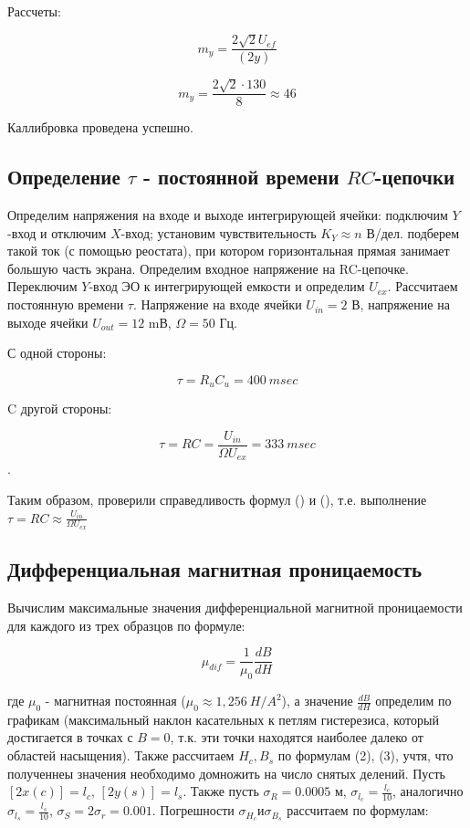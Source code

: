 \documentclass[a4paper, 14pt]{extarticle}
\begin{document}
Рассчеты:

$$m_y=\frac{2\sqrt{2}U_{ef}}{(2y)}$$

$$m_y=\frac{2\sqrt{2} \cdot 130}{8} \approx 46$$

Каллибровка проведена успешно.

\subsection {Определение $\tau$ - постоянной времени $RC$-цепочки}


Определим напряжения на входе и выходе интегрирующей ячейки: подключим $Y$-вход и отключим $X$-вход; установим чувствительность $K_Y \approx n$ В/дел. подберем такой ток (с помощью реостата), при котором горизонтальная прямая занимает большую часть экрана. Определим входное напряжение на RC-цепочке. Переключим $Y$-вход ЭО к интегрирующей емкости и определим $U_{ex}$. Рассчитаем постоянную времени $\tau$.
\newline
Напряжение на входе ячейки $U_{in} = 2$ В, напряжение на выходе ячейки $U_{out} = 12$ mВ, $\Omega=50$ Гц.

С одной стороны:

$$\tau=R_uC_u=400 \: msec
$$


C другой стороны:


$$\tau=RC=\frac{U_{in}}{\Omega U_{ex}}=333 \: msec $$ .

Таким образом, проверили справедливость формул () и (), т.е. выполнение $\tau=RC \approx \frac{U_{in}}{\Omega U_{ex}}$




\subsection{Дифференциальная магнитная проницаемость}



Вычислим максимальные значения дифференциальной магнитной проницаемости  для каждого из трех образцов по формуле:

\begin{equation}\label{}
    \mu_{dif}=\frac{1}{\mu_0}\frac{dB}{dH}
\end{equation}


где $\mu_0$ - магнитная постоянная ($\mu_0\approx1,256~ H/A^2$), а значение $\frac{dB}{dH}$ определим по графикам (максимальный наклон касательных к петлям гистерезиса, который достигается в точках с $B=0$, т.к. эти точки находятся наиболее далеко от областей насыщения).
\newline
Также рассчитаем $H_c, B_s$ по формулам (2), (3), учтя, что полученнеы значения необходимо домножить на число снятых делений.
\newline
Пусть $[2x(c)] = l_c$, $[2y(s)] = l_s$.
\newline
Также пусть $\sigma_R = 0.0005$ м, $\sigma_{l_c} = \frac{l_c}{10}$, аналогично $\sigma_{l_s} = \frac{l_s}{10}$, $\sigma_S = 2\sigma_r = 0.001$.
\newline
Погрешности $\sigma_{H_c} и \sigma_{B_s}$ рассчитаем по формулам:
\end{document}
